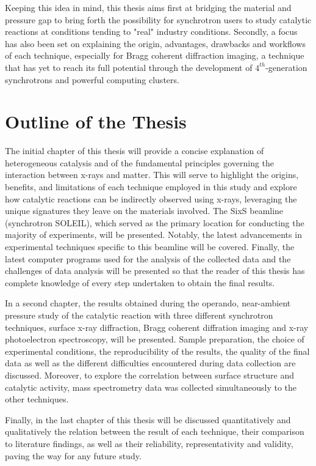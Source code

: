 Keeping this idea in mind, this thesis aims first at bridging the material and pressure gap to bring forth the possibility for synchrotron users to study catalytic reactions at conditions tending to "real" industry conditions.
Secondly, a focus has also been set on explaining the origin, advantages, drawbacks and workflows of each technique, especially for Bragg coherent diffraction imaging, a technique that has yet to reach its full potential through the development of $4^{th}$-generation synchrotrons and powerful computing clusters.

\section{Outline of the Thesis}

The initial chapter of this thesis will provide a concise explanation of heterogeneous catalysis and of the fundamental principles governing the interaction between x-rays and matter.
This will serve to highlight the origins, benefits, and limitations of each technique employed in this study and explore how catalytic reactions can be indirectly observed using x-rays, leveraging the unique signatures they leave on the materials involved.
The SixS beamline (synchrotron SOLEIL), which served as the primary location for conducting the majority of experiments, will be presented.
Notably, the latest advancements in experimental techniques specific to this beamline will be covered.
Finally, the latest computer programs used for the analysis of the collected data and the challenges of data analysis will be presented so that the reader of this thesis has complete knowledge of every step undertaken to obtain the final results.

In a second chapter, the results obtained during the operando, near-ambient pressure study of the catalytic reaction with three different synchrotron techniques, surface x-ray diffraction, Bragg coherent diffration imaging and x-ray photoelectron spectroscopy, will be presented.
Sample preparation, the choice of experimental conditions, the reproducibility of the results, the quality of the final data as well as the different difficulties encountered during data collection are discussed.
Moreover, to explore the correlation between surface structure and catalytic activity, mass spectrometry data was collected simultaneously to the other techniques.

Finally, in the last chapter of this thesis will be discussed quantitatively and qualitatively the relation between the result of each technique, their comparison to literature findings, as well as their reliability, representativity and validity, paving the way for any future study.